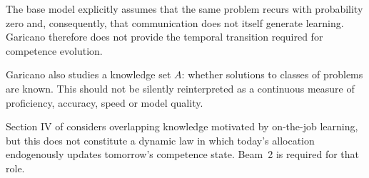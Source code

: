 The base model explicitly assumes that the same problem recurs with probability zero and,
consequently, that communication does not itself generate learning. Garicano therefore does
not provide the temporal transition required for competence evolution.

Garicano also studies a knowledge set \(A\): whether solutions to classes of problems are
known. This should not be silently reinterpreted as a continuous measure of proficiency,
accuracy, speed or model quality.

Section IV of \citet{garicano2000} considers overlapping knowledge motivated by on-the-job
learning, but this does not constitute a dynamic law in which today's allocation endogenously
updates tomorrow's competence state. Beam~2 is required for that role.
